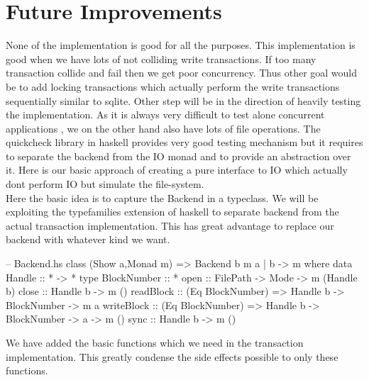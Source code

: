 \documentclass[11pt,a4paper]{article}
\begin{document}
\section{Future Improvements}
None of the implementation is good for all the purposes. This implementation is good when we have lots of not colliding write transactions. If too many transaction collide and fail then we get poor concurrency. Thus other goal would be to add locking transactions which actually perform the write transactions sequentially similar to sqlite. 
Other step will be in the direction of heavily testing the implementation. As it is always very difficult to test alone concurrent applications , we on the other hand also have lots of file operations. The quickcheck library in haskell provides very good testing mechanism but it requires to separate the backend from the IO monad and to provide an abstraction over it.
Here is our basic approach of creating a pure interface to IO which actually dont perform IO but simulate the file-system. \\
Here the basic idea is to capture the Backend in a typeclass. We will be exploiting the typefamilies extension of haskell to separate backend from the actual transaction implementation. This has great advantage to replace our backend with whatever kind we want.\\ 
\begin{code}[name=Backend,firstnumber=1]
-- Backend.hs
class (Show a,Monad m) => Backend b m a | b -> m where 
    data Handle :: * -> * 
    type BlockNumber :: *  
    open :: FilePath -> Mode -> m (Handle b)
    close :: Handle b -> m () 
    readBlock :: (Eq BlockNumber) => Handle b -> BlockNumber -> m a 
    writeBlock :: (Eq BlockNumber) => Handle b -> BlockNumber -> a -> m ()
    sync :: Handle b -> m ()
\end{code}
We have added the basic functions which we need in the transaction implementation. This greatly condense the side effects possible to only these functions.
\end{document}
